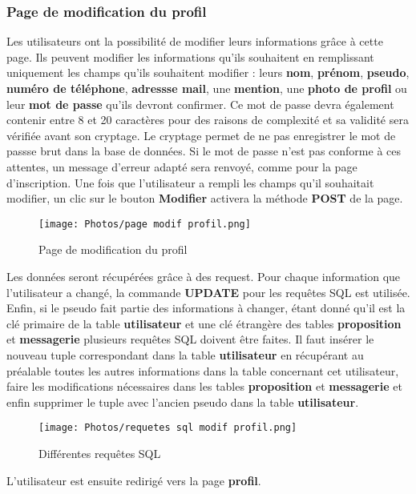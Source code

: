 \documentclass{article}
\begin{document}
\subsubsection{Page de modification du profil}
Les utilisateurs ont la possibilité de modifier leurs informations grâce à cette page. Ils peuvent modifier les informations qu'ils souhaitent en remplissant uniquement les champs qu'ils souhaitent modifier : leurs \textbf{nom}, \textbf{prénom}, \textbf{pseudo}, \textbf{numéro de téléphone}, \textbf{adressse mail}, une \textbf{mention}, une \textbf{photo de profil} ou leur \textbf{mot de passe} qu'ils devront confirmer. Ce mot de passe devra également contenir entre 8 et 20 caractères pour des raisons de complexité et sa validité sera vérifiée avant son cryptage. Le cryptage permet de ne pas enregistrer le mot de passse brut dans la base de données. Si le mot de passe n'est pas conforme à ces attentes, un message d'erreur adapté sera renvoyé, comme pour la page d'inscription.
Une fois que l'utilisateur a rempli les champs qu'il souhaitait modifier, un clic sur le bouton \textbf{Modifier} activera la méthode \textbf{POST} de la page.
\begin{figure}[h!]
    \centering
    \texttt{[image: Photos/page modif profil.png]}
    \caption{Page de modification du profil}
    \label{fig:my_label}
\end{figure} 
\newline
Les données seront récupérées grâce à des request. Pour chaque information que l'utilisateur a changé, la commande \textbf{UPDATE} pour les requêtes SQL est utilisée. Enfin, si le pseudo fait partie des informations à changer, étant donné qu'il est la clé primaire de la table \textbf{utilisateur} et une clé étrangère des tables \textbf{proposition} et \textbf{messagerie} plusieurs requêtes SQL doivent être faites. Il faut insérer le nouveau tuple correspondant dans la table \textbf{utilisateur} en récupérant au préalable toutes les autres informations dans la table concernant cet utilisateur, faire les modifications nécessaires dans les tables \textbf{proposition} et \textbf{messagerie} et enfin supprimer le tuple avec l'ancien pseudo dans la table \textbf{utilisateur}.
\begin{figure}[h!]
    \centering
    \texttt{[image: Photos/requetes sql modif profil.png]}
    \caption{Différentes requêtes SQL}
    \label{fig:my_label}
\end{figure}
\newline
L'utilisateur est ensuite redirigé vers la page \textbf{profil}.
\end{document}
